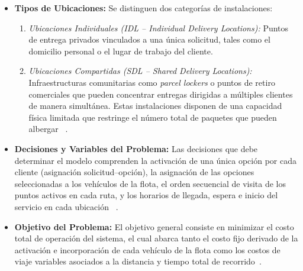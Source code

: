 \documentclass[letter, 10pt]{article}
\begin{document}
\begin{itemize} 
    \item \textbf{Tipos de Ubicaciones:} Se distinguen dos categorías de instalaciones: 
    \begin{enumerate} 
        \item \emph{Ubicaciones Individuales (IDL -- Individual Delivery Locations):} Puntos de entrega privados vinculados a una única solicitud, tales como el domicilio personal o el lugar de trabajo del cliente. 
        \item \emph{Ubicaciones Compartidas (SDL -- Shared Delivery Locations):} Infraestructuras comunitarias como \emph{parcel lockers} o puntos de retiro comerciales que pueden concentrar entregas dirigidas a múltiples clientes de manera simultánea. Estas instalaciones disponen de una capacidad física limitada que restringe el número total de paquetes que pueden albergar ~\cite{Dumez21Large, Yang25Neighborhood}. \end{enumerate} 
    \item \textbf{Decisiones y Variables del Problema:} Las decisiones que debe determinar el modelo comprenden la activación de una única opción por cada cliente (asignación solicitud--opción), la asignación de las opciones seleccionadas a los vehículos de la flota, el orden secuencial de visita de los puntos activos en cada ruta, y los horarios de llegada, espera e inicio del servicio en cada ubicación ~\cite{ Dumez21Large, Tilk21LastMile}. 
    \item \textbf{Objetivo del Problema:} El objetivo general consiste en minimizar el costo total de operación del sistema, el cual abarca tanto el costo fijo derivado de la activación e incorporación de cada vehículo de la flota como los costos de viaje variables asociados a la distancia y tiempo total de recorrido~\cite{Tilk21LastMile, Yang25Neighborhood}.
\end{itemize} 
\end{document}
